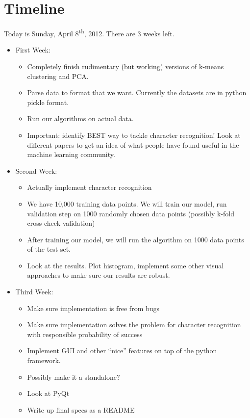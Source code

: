 \documentclass[12pt]{article} %
\begin{document}
\section{Timeline}
Today is Sunday, April 8\textsuperscript{th}, 2012. 
There are 3 weeks left. 
\begin{itemize}
	\item First Week: 
		\begin{itemize}
			\item Completely finish rudimentary (but working) versions of k-means clustering and PCA. 
			\item Parse data to format that we want. Currently the datasets are in python pickle format. 
			\item Run our algorithms on actual data. 
			\item Important: identify BEST way to tackle character recognition! Look at different papers to get an idea of 
			what people have found useful in the machine learning community. 
		\end{itemize}

	\item Second Week: 
		\begin{itemize}
			\item Actually implement character recognition 
			\item We have 10,000 training data points. We will train our model, run validation step on 1000 randomly chosen data points (possibly k-fold cross check validation)
			\item After training our model, we will run the algorithm on 1000 data points of the test set.
			\item Look at the results. Plot histogram, implement some other visual approaches to make sure our results are robust. 
		\end{itemize}

	\item Third Week:
		\begin{itemize}
			\item Make sure implementation is free from bugs
			\item Make sure implementation solves the problem for character recognition with responsible probability of success 
			\item Implement GUI and other ``nice'' features on top of the python framework. 
			\item Possibly make it a standalone? 
			\item Look at PyQt
			\item Write up final specs as a README
		\end{itemize}

\end{itemize}
\end{document}

